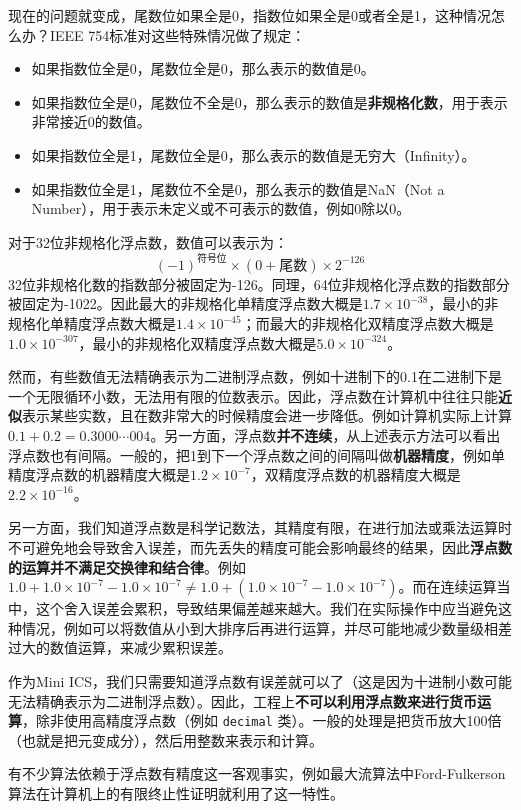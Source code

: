 现在的问题就变成，尾数位如果全是0，指数位如果全是0或者全是1，这种情况怎么办？IEEE 754标准对这些特殊情况做了规定：
\begin{itemize}
  \item 如果指数位全是0，尾数位全是0，那么表示的数值是0。
  \item 如果指数位全是0，尾数位不全是0，那么表示的数值是\textbf{非规格化数}，用于表示非常接近0的数值。
  \item 如果指数位全是1，尾数位全是0，那么表示的数值是无穷大（Infinity）。
  \item 如果指数位全是1，尾数位不全是0，那么表示的数值是NaN（Not a Number），用于表示未定义或不可表示的数值，例如0除以0。
\end{itemize}
对于32位非规格化浮点数，数值可以表示为：
$$(-1)^{\text{符号位}} \times (0 + \text{尾数}) \times 2^{-126}$$
32位非规格化数的指数部分被固定为-126。同理，64位非规格化浮点数的指数部分被固定为-1022。因此最大的非规格化单精度浮点数大概是$1.7 \times 10^{-38}$，最小的非规格化单精度浮点数大概是$1.4 \times 10^{-45}$；而最大的非规格化双精度浮点数大概是$1.0 \times 10^{-307}$，最小的非规格化双精度浮点数大概是$5.0 \times 10^{-324}$。

然而，有些数值无法精确表示为二进制浮点数，例如十进制下的0.1在二进制下是一个无限循环小数，无法用有限的位数表示。因此，浮点数在计算机中往往只能\textbf{近似}表示某些实数，且在数非常大的时候精度会进一步降低。例如计算机实际上计算$0.1+0.2=0.3000\cdots 004$。另一方面，浮点数\textbf{并不连续}，从上述表示方法可以看出浮点数也有间隔。一般的，把1到下一个浮点数之间的间隔叫做\textbf{机器精度}，例如单精度浮点数的机器精度大概是$1.2 \times 10^{-7}$，双精度浮点数的机器精度大概是$2.2 \times 10^{-16}$。

另一方面，我们知道浮点数是科学记数法，其精度有限，在进行加法或乘法运算时不可避免地会导致舍入误差，而先丢失的精度可能会影响最终的结果，因此\textbf{浮点数的运算并不满足交换律和结合律}。例如$1.0 + 1.0 \times 10^{-7} - 1.0 \times 10^{-7} \neq 1.0 + (1.0 \times 10^{-7} - 1.0 \times 10^{-7})$。而在连续运算当中，这个舍入误差会累积，导致结果偏差越来越大。我们在实际操作中应当避免这种情况，例如可以将数值从小到大排序后再进行运算，并尽可能地减少数量级相差过大的数值运算，来减少累积误差。

作为Mini ICS，我们只需要知道浮点数有误差就可以了（这是因为十进制小数可能无法精确表示为二进制浮点数）。因此，工程上\textbf{不可以利用浮点数来进行货币运算}，除非使用高精度浮点数（例如 \texttt{decimal} 类）。一般的处理是把货币放大100倍（也就是把元变成分），然后用整数来表示和计算。

有不少算法依赖于浮点数有精度这一客观事实，例如最大流算法中Ford-Fulkerson算法在计算机上的有限终止性证明就利用了这一特性。

